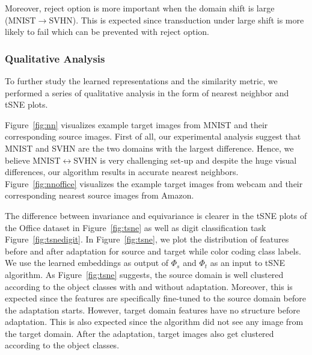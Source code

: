 \noindent Moreover, reject option is more important when the domain shift is large (\eg MNIST$\rightarrow$SVHN). This is expected since transduction under large  shift is more likely to fail which can be prevented with reject option.




\subsubsection{Qualitative Analysis}
To further study the learned representations and the similarity metric, we performed a series of qualitative analysis in the form of nearest neighbor and tSNE\cite{tsne} plots.


Figure~\ref{fig:nn} visualizes example target images from MNIST and their corresponding source images. First of all, our experimental analysis suggest that MNIST and SVHN are the two domains with the largest difference. Hence, we believe MNIST$\leftrightarrow$SVHN is very challenging set-up and despite the huge visual differences, our algorithm results in accurate nearest neighbors. Figure~\ref{fig:nnoffice} visualizes the example target images from webcam and their corresponding nearest source images from Amazon. 


The difference between invariance and equivariance is clearer in the tSNE plots of the Office dataset in Figure~\ref{fig:tsne} as well as digit classification task Figure~\ref{fig:tsnedigit}. In Figure~\ref{fig:tsne}, we plot the distribution of features before and after adaptation for source and target while color coding class labels. We use the learned embeddings as output of $\Phi_s$ and $\Phi_t$ as an input to tSNE algorithm\cite{tsne}. As Figure~\ref{fig:tsne} suggests, the source domain is well clustered according to the object classes with and without adaptation. Moreover, this is expected since the features are specifically fine-tuned to the source domain before the adaptation starts. However, target domain features have no structure before adaptation. This is also expected since the algorithm did not see any image from the target domain. After the adaptation, target images also get clustered according to the object classes. 




